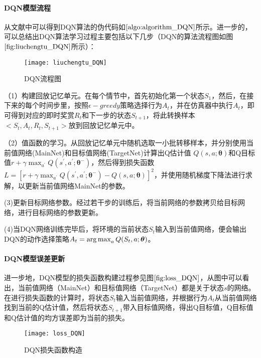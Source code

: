 \paragraph{DQN模型流程}
 从文献\citep{mnih2015human}中可以得到DQN算法的伪代码如$\ref{algo:algorithm_DQN}$所示。进一步的，可以总结出DQN算法学习过程主要包括以下几步（DQN的算法流程图如图$\ref{fig:liuchengtu_DQN}$所示）：

 \begin{figure}[htbp]
\centering
\texttt{[image: liuchengtu\_DQN]}
\caption{DQN流程图}
\label{fig:liuchengtu_DQN}
\end{figure}
 

（1）构建回放记忆单元。在每个情节中，首先初始化第一个状态$S_{1}$，然后，在接下来的每个时间步里，按照$\epsilon-greedy$策略选择行为$A_{t}$，并在仿真器中执行$A_{t}$，即可得到对应的即时奖赏$R_{t}$和下一步的状态$S_{t+1}$，将此转换样本$<S_{t}, A_{t}, R_{t}, S_{t+1}>$放到回放记忆单元中。

（2）值函数的学习。从回放记忆单元中随机选取一小批转移样本，并分别使用当前值网络(MainNet)和目标值网络(TargetNet)计算出Q估计值 $Q(s,a;\bm{\theta})$和Q目标值$r+\gamma \max_{a^{'}}Q(s^{'},a^{'};\bm{\theta}^{-})$，然后得到损失函数$L=[r+\gamma \max_{a^{'}}Q(s^{'},a^{'};\bm{\theta}^{-})-Q(s,a;\bm{\theta})]^{2}$，并使用随机梯度下降法进行求解，以更新当前值网络MainNet的参数。

(3)更新目标网络参数。经过若干步的训练后，将当前网络的参数拷贝给目标网络，进行目标网络的参数更新。 

(4)当DQN网络训练完毕后，将环境的当前状态$S_{t}$输入到当前值网络，便会输出DQN的动作选择策略$A_{t}=\operatorname*{arg\,max}_{a}Q(S_{t},a;\bm{\theta})$。

\paragraph{DQN模型误差更新}
进一步地，DQN模型的损失函数构建过程参见图$\ref{fig:loss_DQN}$，从图中可以看出，当前值网络（MainNet）和目标值网络（TargetNet）都是关于状态$s$的网络。在进行损失函数的计算时，将状态$S_{t}$输入当前值网络，并根据行为$A_{t}$从当前值网络找到当前的Q估计值，然后将状态$S_{t+1}$带入目标值网络，得出Q目标值，Q目标值和Q估计值的均方误差即为当前的损失。

\begin{figure}[htbp]
\centering
\texttt{[image: loss\_DQN]}
\caption{DQN损失函数构造}
\label{fig:loss_DQN}
\end{figure}

